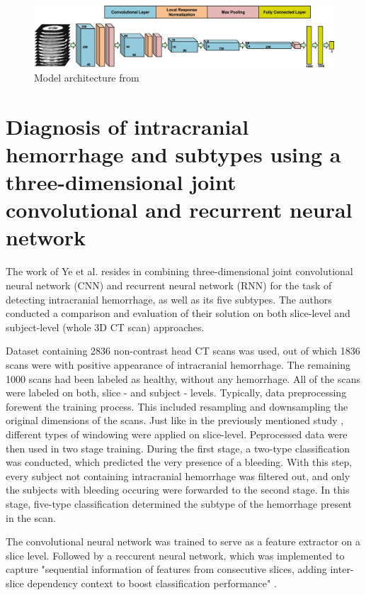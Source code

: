 \begin{figure}[h]
\begin{centering}
\includegraphics[width=16cm]{assets/images/RW1-net-arch.png}
\par\end{centering}
\caption{Model architecture from \cite{relatedWork1} \label{fig:rw1}}
\end{figure}


\section{Diagnosis of intracranial hemorrhage and subtypes using a three-dimensional joint convolutional and recurrent neural network}

The work of Ye et al. \cite{relatedWork2} resides in combining three-dimensional joint convolutional neural network (CNN) and recurrent neural network (RNN) for the task of detecting intracranial hemorrhage, as well as its five subtypes. The authors conducted a comparison and evaluation of their solution on both slice-level and subject-level (whole 3D CT scan) approaches.

Dataset containing 2836 non-contrast head CT scans was used, out of which 1836 scans were with positive appearance of intracranial hemorrhage. The remaining 1000 scans had been labeled as healthy, without any hemorrhage. All of the scans were labeled on both, slice - and subject - levels. Typically, data preprocessing forewent the training process. This included resampling and downsampling the original dimensions of the scans. Just like in the previously mentioned study \cite{relatedWork1}, different types of windowing were applied on slice-level. Peprocessed data were then used in two stage training. During the first stage, a two-type classification was conducted, which predicted the very presence of a bleeding. With this step, every subject not containing intracranial hemorrhage was filtered out, and only the subjects with bleeding occuring were forwarded to the second stage. In this stage, five-type classification determined the subtype of the hemorrhage present in the scan.

The convolutional neural network was trained to serve as a feature extractor on a slice level. Followed by a reccurent neural network, which was implemented to capture "sequential information of features from consecutive slices, adding inter-slice dependency context to boost classification performance" \cite{relatedWork2}.
